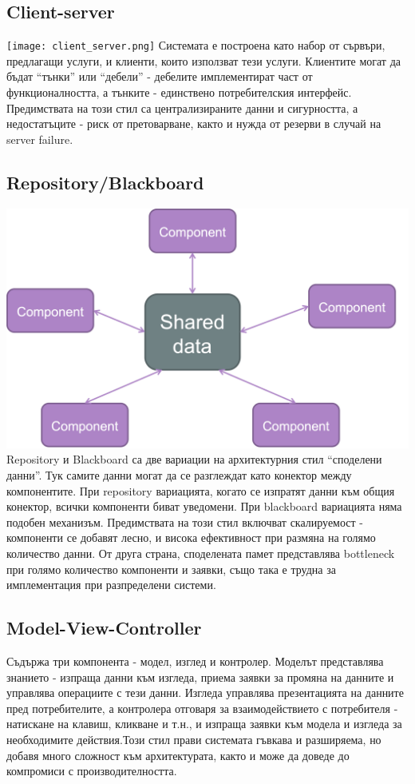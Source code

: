 \documentclass[fleqn,12pt]{article}
\begin{document}
\subsection{Client-server}
\texttt{[image: client\_server.png]}
Системата е построена като набор от сървъри, предлагащи услуги, и клиенти, които използват тези услуги. Клиентите могат да бъдат “тънки” или “дебели” - дебелите имплементират част от функционалността, а тънките - единствено потребителския интерфейс. Предимствата на този стил са централизираните данни и сигурността, а недостатъците - риск от претоварване, както и нужда от резерви в случай на server failure.

\subsection{Repository/Blackboard}
\includegraphics[width=175mm]{shared_memory.png}
Repository и Blackboard са две вариации на архитектурния стил “споделени данни”. Тук самите данни могат да се разглеждат като конектор между компонентите.
При repository вариацията, когато се изпратят данни към общия конектор, всички компоненти биват уведомени. При blackboard вариацията няма подобен механизъм.
Предимствата на този стил включват скалируемост - компоненти се добавят лесно, и висока ефективност при размяна на голямо количество данни. От друга страна, споделената памет представлява bottleneck при голямо количество компоненти и заявки, също така е трудна за имплементация при разпределени системи.

\subsection{Model-View-Controller}
Съдържа три компонента - модел, изглед и контролер.
Моделът представлява знанието - изпраща данни към изгледа, приема заявки за промяна на данните и управлява операциите с тези данни. Изгледа управлява презентацията на данните пред потребителите, а контролера отговаря за взаимодействието с потребителя - натискане на клавиш, кликване и т.н., и изпраща заявки към модела и изгледа за необходимите действия.Този стил прави системата гъвкава и разширяема, но добавя много сложност към архитектурата, както и може да доведе до компромиси с производителността.
\end{document}
